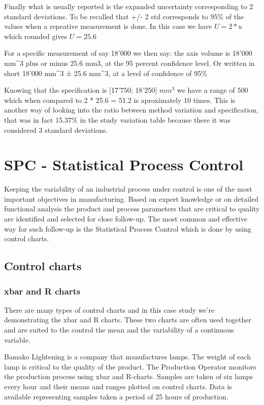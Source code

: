 \documentclass[
]{book}
\begin{document}
Finally what is usually reported is the expanded uncertainty corresponding to 2 standard deviations. To be recalled that +/- 2 std corresponds to 95\% of the values when a repeative measurement is done. In this case we have \(U = 2*u\) which rounded gives \(U = 25.6\)

For a specific measurement of say 18'000 we then say: the axis volume is 18'000 mm\^{}3 plus or minus
25.6 mm3, at the 95 percent confidence level. Or written in short 18'000 mm\^{}3 ± 25.6 mm\^{}3, at a level of confidence of 95\%

Knowing that the specification is {[}17'750; 18'250{]} \(mm^3\) we have a range of 500 which when compared to 2 * 25.6 = 51.2 is aproximately 10 times. This is another way of looking into the ratio between method variation and specification, that was in fact 15.37\% in the study variation table because there it was considered 3 standard deviations.

\hypertarget{SPC}{%
\chapter{SPC - Statistical Process Control}\label{SPC}}

Keeping the variability of an industrial process under control is one of the most important objectives in manufacturing. Based on expert knowledge or on detailed functional analysis the product and process parameters that are critical to quality are identified and selected for close follow-up. The most common and effective way for such follow-up is the Statistical Process Control which is done by using control charts.

\hypertarget{control-charts}{%
\section{Control charts}\label{control-charts}}

\hypertarget{xbar-and-r-charts}{%
\subsection{xbar and R charts}\label{xbar-and-r-charts}}

There are many types of control charts and in this case study we're demonstrating the xbar and R charts. These two charts are often used together and are suited to the control the mean and the variability of a continuous variable.

Bamako Lightening is a company that manufactures lamps. The weight of each lamp is critical to the quality of the product. The Production Operator monitors the production process using xbar and R-charts. Samples are taken of six lamps every hour and their means and ranges plotted on control charts. Data is available representing samples taken a period of 25 hours of production.
\end{document}
